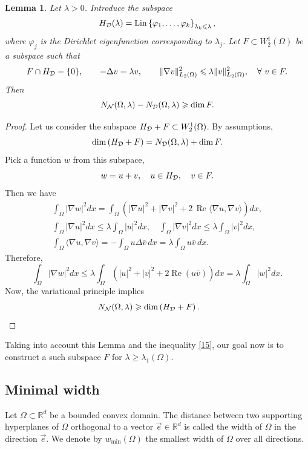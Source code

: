 \documentclass[a4paper,12pt]{article}
\numberwithin{equation}{section}
\def \la{\lambda}
\def \ph{\varphi}
\def \D{\Delta}
\def \O{\Omega}
\def \R{\mathbb{R}}
\def\n{\nabla}
\def\re{\operatorname{Re}}
\newcommand{\<}{\langle}
\renewcommand{\>}{\rangle}
\theoremstyle{plain}
\newtheorem{lemma}[theorem]{\bf Lemma}
\theoremstyle{definition}
\theoremstyle{remark}
\renewcommand{\le}{\leqslant}
\renewcommand{\ge}{\geqslant}
\begin{document}
\begin{lemma}
\label{l31}
Let $\la > 0$.
Introduce the subspace
\begin{equation}
\label{30}
H_{\cal D} (\la) = \operatorname{Lin} \left\{\ph_1, \dots, \ph_k\right\}_{\la_k \le \la},
\end{equation}
where $\ph_j$ is the Dirichlet eigenfunction corresponding to $\la_j$.
Let $F \subset W_2^1 (\O)$ be a subspace such that
$$
F \cap H_{\cal D} = \{0\}, \qquad
- \D v = \la v, \qquad
\|\n v\|_{L_2(\O)}^2 \le \la \|v\|_{L_2(\O)}^2, \quad \forall \ v \in F.
$$
Then
$$
N_{\cal N} (\O, \la) - N_{\cal D} (\O, \la) \ge \dim F.
$$
\end{lemma}

\begin{proof}
Let us consider the subspace $H_{\cal D} + F \subset W_2^1 (\O)$.
By assumptions,
$$
\dim \left(H_{\cal D} + F\right) = N_{\cal D} (\O, \la) + \dim F.
$$
Pick a function $w$ from this subspace,
$$
w = u + v, \quad u \in H_{\cal D}, \quad v \in F.
$$
Then we have
\begin{eqnarray*}
\int_\O |\n w|^2 dx = 
\int_\O \left(|\nabla u|^2 + |\nabla v|^2 +
2\, \re \langle \nabla u, \nabla v\rangle \right) dx, \\
\int_\O |\n u|^2 dx \le \la \int_\O |u|^2 dx, \quad
\int_\O |\n v|^2 dx \le \la \int_\O |v|^2 dx, \\
\int_\O \langle \nabla u, \nabla v\rangle 
= - \int_\O u \D \overline v \, dx = \la \int_\O u \overline v \, dx.
\end{eqnarray*}
Therefore,
$$
\int_\O |\n w|^2 dx
\le \la \int_\O\left(|u|^2 + |v|^2 + 2 \re (u \overline v)\right) dx
= \la \int_\O |w|^2 dx.
$$
Now, the variational principle implies
$$
N_{\cal N} (\O, \la) \ge \dim \left(H_{\cal D} + F\right).
\qquad \qedhere
$$
\end{proof}

Taking into account this Lemma and the inequality \eqref{15},
our goal now is to construct a such subspace $F$ for $\la \ge \la_1 (\O)$.

\subsection{Minimal width}
\label{smw}
Let $\O \subset \R^d$ be a bounded convex domain.
The distance between two supporting hyperplanes of $\O$
orthogonal to a vector $\vec e \in \R^d$ is called the width
of $\O$ in the direction $\vec e$.
We denote by $w_{\min} (\O)$ the smallest width of $\O$ 
over all directions.
\end{document}
